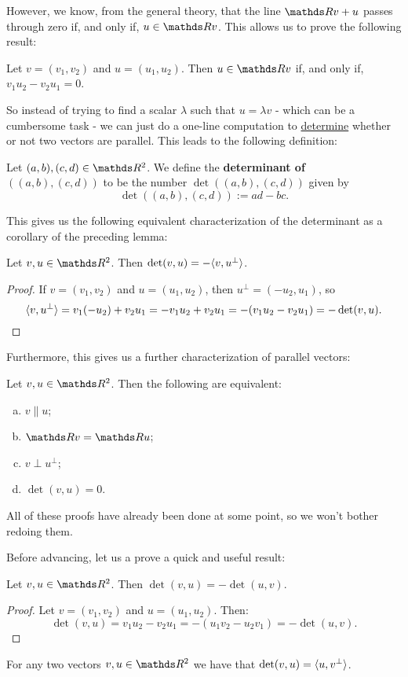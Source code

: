However, we know, from the general theory, that the line $\R v+u$ passes through zero if, and only if, $u\in \R v$. This allows us to prove the following result:

\begin{lemma}
	Let $v=(v_1,v_2)$ and $u=(u_1,u_2)$. Then $u\in \R v$ if, and only if, $v_1u_2-v_2u_1=0$.
\end{lemma}

So instead of trying to find a scalar $\lambda$ such that $u=\lambda v$ - which can be a cumbersome task - we can just do a one-line computation to \underline{determine} whether or not two vectors are parallel. This leads to the following definition:

\begin{df}
	Let $(a,b),(c,d)\in \R^2$. We define the \textbf{determinant of $((a,b),(c,d))$} to be the number $\det((a,b),(c,d))$ given by
	\[\det((a,b),(c,d)):=ad-bc.\]
\end{df}

This gives us the following equivalent characterization of the determinant as a corollary of the preceding lemma:

\begin{cor}
	Let $v,u\in \R^2$. Then $\det(v,u)=-\langle v,u^\perp\rangle$.
\end{cor}
\begin{proof}
	If $v=(v_1,v_2)$ and $u=(u_1,u_2)$, then $u^\perp=(-u_2,u_1)$, so
	\[\langle v,u^\perp\rangle=v_1(-u_2)+v_2u_1=-v_1u_2+v_2u_1=-(v_1u_2-v_2u_1)=-\det(v,u).\]
\end{proof}

Furthermore, this gives us a further characterization of parallel vectors:

\begin{prop}
	Let $v,u\in \R^2$. Then the following are equivalent:
	\begin{enumerate}[a)]
		\item $v\parallel u$;
		\item $\R v=\R u$;
		\item $v\perp u^\perp$;
		\item $\det(v,u)=0$.
	\end{enumerate}
\end{prop}

All of these proofs have already been done at some point, so we won't bother redoing them.

Before advancing, let us a prove a quick and useful result:

\begin{prop}
	Let $v,u\in \R^2$. Then $\det(v,u)=-\det(u,v)$.
\end{prop}
\begin{proof}
	Let $v=(v_1,v_2)$ and $u=(u_1,u_2)$. Then:
	\[\det(v,u)=v_1u_2-v_2u_1=-(u_1v_2-u_2v_1)=-\det(u,v).\]
\end{proof}
\begin{cor}
	For any two vectors $v,u\in \R^2$ we have that $\det(v,u)=\langle u,v^\perp\rangle$.
\end{cor}

